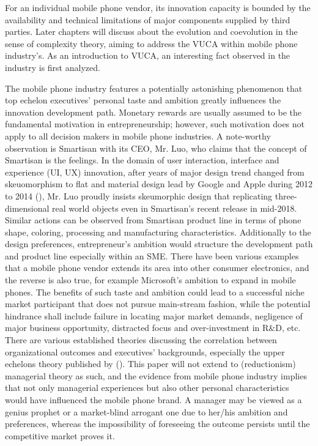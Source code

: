 \documentclass[utf8,english]{gradu3}
\begin{document}
For an individual mobile phone vendor, its innovation capacity is bounded by the availability and technical limitations of major components supplied by third parties. Later chapters will discuss about the evolution and coevolution in the sense of complexity theory, aiming to address the VUCA within mobile phone industry's. As an introduction to VUCA, an interesting fact observed in the industry is first analyzed.

The mobile phone industry features a potentially astonishing phenomenon that top echelon executives' personal taste and ambition greatly influences the innovation development path. Monetary rewards are usually assumed to be the fundamental motivation in entrepreneurship; however, such motivation does not apply to all decision makers in mobile phone industries. A note-worthy observation is Smartisan with its CEO, Mr. Luo, who claims that the concept of Smartisan is the feelings. In the domain of user interaction, interface and experience (UI, UX) innovation, after years of major design trend changed from skeuomorphism to flat and material design lead by Google and Apple during 2012 to 2014 (\cite{burmistrov2015flat}), Mr. Luo proudly insists skeumorphic design that replicating three-dimensional real world objects even in Smartisan's recent release in mid-2018. Similar actions can be observed from Smartisan product line in terms of phone shape, coloring, processing and manufacturing characteristics. Additionally to the design preferences, entrepreneur's ambition would structure the development path and product line especially within an SME. There have been various examples that a mobile phone vendor extends its area into other consumer electronics, and the reverse is also true, for example Microsoft's ambition to expand in mobile phones. The benefits of such taste and ambition could lead to a successful niche market participant that does not pursue main-stream fashion, while the potential hindrance shall include failure in locating major market demands, negligence of major business opportunity, distracted focus and over-investment in R\&D, etc. There are various established theories discussing the correlation between organizational outcomes and executives' backgrounds, especially the upper echelons theory published by \citeauthor{hambrick1984upper} (\citeyear{hambrick1984upper}). This paper will not extend to (reductionism) managerial theory as such, and the evidence from mobile phone industry implies that not only managerial experiences but also other personal characteristics would have influenced the mobile phone brand. A manager may be viewed as a genius prophet or a market-blind arrogant one due to her/his ambition and preferences, whereas the impossibility of foreseeing the outcome persists until the competitive market proves it.
\end{document}
